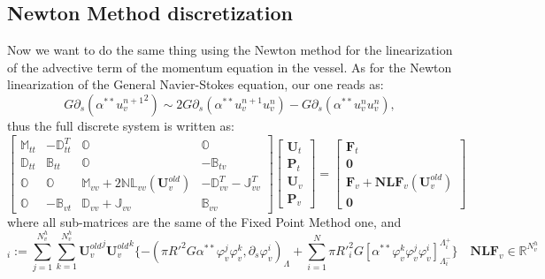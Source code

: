 \documentclass[a4paper]{report}
\begin{document}
\subsection{Newton Method discretization}
Now we want to do the same thing using the Newton method for the linearization of the advective term of the momentum equation in the vessel. As for the Newton linearization of the General Navier-Stokes equation, our one reads as:
\begin{equation}
G \partial_s(\alpha^{**} {u_v^{n+1}}^2) \sim  2 G \partial_s(\alpha^{**} u_v^{n+1} u_v^n) -G \partial_s(\alpha^{**} u_v^{n} u_v^n) ,
\end{equation}
thus the full discrete system is written as:
\begin{equation}
\begin{bmatrix}
\mathbb{M}_{tt} & -\mathbb{D}_{tt}^T & \mathbb{O} & \mathbb{O} \\
\mathbb{D}_{tt} & \mathbb{B}_{tt} &\mathbb{O} & -\mathbb{B}_{tv}\\
\mathbb{O} & \mathbb{O} & \mathbb{M}_{vv} +2 \mathbb{NL}_{vv}(\mathbf{U}_v^{old}) & -\mathbb{D}_{vv}^T - \mathbb{J}_{vv}^T\\
\mathbb{O} & -\mathbb{B}_{vt} & \mathbb{D}_{vv} + \mathbb{J}_{vv} & \mathbb{B}_{vv}
\end{bmatrix}\left[
\begin{array}{c}
\mathbf{U}_t \\ \mathbf{P}_t \\ \mathbf{U}_v \\ \mathbf{P}_v
\end{array} \right]
=\left[
\begin{array}{c}
\mathbf{F}_t \\ \mathbf{0} \\ \mathbf{F}_v+\mathbf{NLF}_v(\mathbf{U}_v^{old}) \\ \mathbf{0}
\end{array}
\right]
\end{equation}
where all sub-matrices are the same of the Fixed Point Method one, and
\begin{equation*}
[\mathbf{NLF}_v(\mathbf{U}_v^{old})]_i := \sum_{j=1}^{N^h_v}  \sum_{k=1}^{N^h_v} {\mathbf{U}_v^{old}}^j {\mathbf{U}_v^{old}}^k  \{ -(\pi R'^2 G \alpha^{**}\varphi^j_v \varphi^k_v,\partial_s\varphi_v^i)_{\Lambda} +\sum^N_{i=1}\pi R'^2_i G [\alpha^{**}\varphi_v^k \varphi_v^j \varphi_v^i ]^{\Lambda_i^+}_{\Lambda_i^-}\} \quad \mathbf{NLF}_{v} \in  \mathbb{R}^{N_v^h}
\end{equation*}
\end{document}
